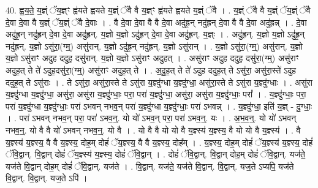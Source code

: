 \documentclass[17pt]{extarticle}
\begin{document}
40. ह्व॒य॒ते॒ य॒ज्ञ्ं ॅय॒ज्ञ्ꣳ ह्व॑यते ह्वयते य॒ज्ञ्ं ॅवै वै य॒ज्ञ्ꣳ ह्व॑यते ह्वयते य॒ज्ञ्ं ॅवै । . य॒ज्ञ्ं ॅवै वै य॒ज्ञ्ं ॅय॒ज्ञ्ं ॅवै दे॒वा दे॒वा वै य॒ज्ञ्ं ॅय॒ज्ञ्ं ॅवै दे॒वाः । . वै दे॒वा दे॒वा वै वै दे॒वा अदु॑ह्र॒न् नदु॑ह्रन् दे॒वा वै वै दे॒वा अदु॑ह्रन्न् । . दे॒वा अदु॑ह्र॒न् नदु॑ह्रन् दे॒वा दे॒वा अदु॑ह्रन्. य॒ज्ञो य॒ज्ञो ऽदु॑ह्रन् दे॒वा दे॒वा अदु॑ह्रन्. य॒ज्ञ्ः । . अदु॑ह्रन्. य॒ज्ञो य॒ज्ञो ऽदु॑ह्र॒न् नदु॑ह्रन्. य॒ज्ञो ऽसु॑रा॒(ग्म्॒) असु॑रान्. य॒ज्ञो ऽदु॑ह्र॒न् नदु॑ह्रन्. य॒ज्ञो ऽसु॑रान् । . य॒ज्ञो ऽसु॑रा॒(ग्म्॒) असु॑रान्. य॒ज्ञो य॒ज्ञो ऽसु॑राꣳ अदुह ददुह॒ दसु॑रान्. य॒ज्ञो य॒ज्ञो ऽसु॑राꣳ अदुहत् । . असु॑राꣳ अदुह ददुह॒ दसु॑रा॒(ग्म्॒) असु॑राꣳ अदुह॒त् ते ते॑ ऽदुह॒दसु॑रा॒(ग्म्॒) असु॑राꣳ अदुह॒त् ते । . अ॒दु॒ह॒त् ते ते॑ ऽदुह ददुह॒त् ते ऽसु॑रा॒ असु॑रा॒स्ते॑ ऽदुह ददुह॒त् ते ऽसु॑राः । . ते ऽसु॑रा॒ असु॑रा॒स्ते ते ऽसु॑रा य॒ज्ञ्दु॑ग्धा य॒ज्ञ्दु॑ग्धा॒ असु॑रा॒स्ते ते ऽसु॑रा य॒ज्ञ्दु॑ग्धाः । . असु॑रा य॒ज्ञ्दु॑ग्धा य॒ज्ञ्दु॑ग्धा॒ असु॑रा॒ असु॑रा य॒ज्ञ्दु॑ग्धाः॒ परा॒ परा॑ य॒ज्ञ्दु॑ग्धा॒ असु॑रा॒ असु॑रा य॒ज्ञ्दु॑ग्धाः॒ परा᳚ । . य॒ज्ञ्दु॑ग्धाः॒ परा॒ परा॑ य॒ज्ञ्दु॑ग्धा य॒ज्ञ्दु॑ग्धाः॒ परा॑ ऽभवन् नभव॒न् परा॑ य॒ज्ञ्दु॑ग्धा य॒ज्ञ्दु॑ग्धाः॒ परा॑ ऽभवन्न् । . य॒ज्ञ्दु॑ग्धा॒ इति॑ य॒ज्ञ् - दु॒ग्धाः॒ । . परा॑ ऽभवन् नभव॒न् परा॒ परा॑ ऽभव॒न्॒. यो यो॑ ऽभव॒न् परा॒ परा॑ ऽभव॒न्॒. यः । . अ॒भ॒व॒न्॒. यो यो॑ ऽभवन् नभव॒न्॒. यो वै वै यो॑ ऽभवन् नभव॒न्॒. यो वै । . यो वै वै यो यो वै य॒ज्ञ्स्य॑ य॒ज्ञ्स्य॒ वै यो यो वै य॒ज्ञ्स्य॑ । . वै य॒ज्ञ्स्य॑ य॒ज्ञ्स्य॒ वै वै य॒ज्ञ्स्य॒ दोह॒म् दोहं॑ ॅय॒ज्ञ्स्य॒ वै वै य॒ज्ञ्स्य॒ दोह᳚म् । . य॒ज्ञ्स्य॒ दोह॒म् दोहं॑ ॅय॒ज्ञ्स्य॑ य॒ज्ञ्स्य॒ दोहं॑ ॅवि॒द्वान्. वि॒द्वान् दोहं॑ ॅय॒ज्ञ्स्य॑ य॒ज्ञ्स्य॒ दोहं॑ ॅवि॒द्वान् । . दोहं॑ ॅवि॒द्वान्. वि॒द्वान् दोह॒म् दोहं॑ ॅवि॒द्वान्. यज॑ते॒ यज॑ते वि॒द्वान् दोह॒म् दोहं॑ ॅवि॒द्वान्. यज॑ते । . वि॒द्वान्. यज॑ते॒ यज॑ते वि॒द्वान्. वि॒द्वान्. यज॒ते ऽप्यपि॒ यज॑ते वि॒द्वान्. वि॒द्वान्. यज॒ते ऽपि॑ । \newline
\pagebreak
{}
\end{document}
